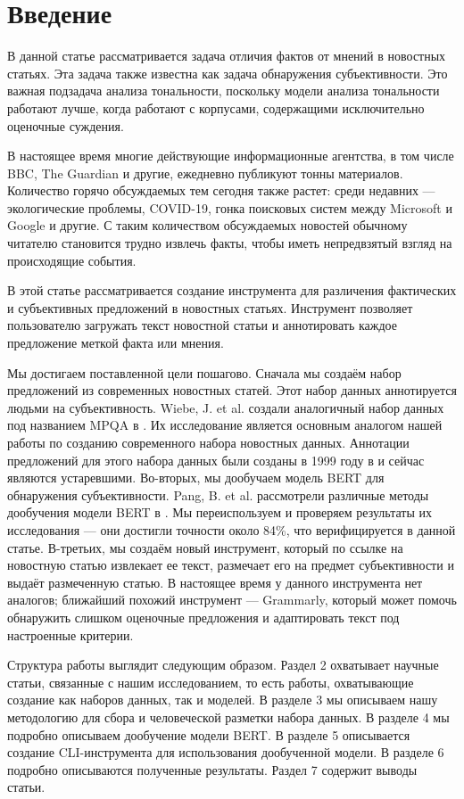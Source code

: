 \documentclass[a4paper,14pt]{extarticle}
\begin{document}
    \section{Введение}
    В данной статье рассматривается задача отличия фактов от мнений в новостных статьях. Эта задача также известна как задача обнаружения субъективности. Это важная подзадача анализа тональности, поскольку модели анализа тональности работают лучше, когда работают с корпусами, содержащими исключительно оценочные суждения.
    
    В настоящее время многие действующие информационные агентства, в том числе BBC, The Guardian и другие, ежедневно публикуют тонны материалов. Количество горячо обсуждаемых тем сегодня также растет: среди недавних — экологические проблемы, COVID-19, гонка поисковых систем между Microsoft и Google и другие. С таким количеством обсуждаемых новостей обычному читателю становится трудно извлечь факты, чтобы иметь непредвзятый взгляд на происходящие события.
    
    В этой статье рассматривается создание инструмента для различения фактических и субъективных предложений в новостных статьях. Инструмент позволяет пользователю загружать текст новостной статьи и аннотировать каждое предложение меткой факта или мнения.
    
    Мы достигаем поставленной цели пошагово. Сначала мы создаём набор предложений из современных новостных статей. Этот набор данных аннотируется людьми на субъективность. Wiebe, J. et al. создали аналогичный набор данных под названием MPQA в \cite{mpqa}. Их исследование является основным аналогом нашей работы по созданию современного набора новостных данных. Аннотации предложений для этого набора данных были созданы в 1999 году в \cite{mpqa-opinion} и сейчас являются устаревшими. Во-вторых, мы дообучаем модель BERT для обнаружения субъективности. Pang, B. et al. рассмотрели различные методы дообучения модели BERT в \cite{bert-finetune}. Мы переиспользуем и проверяем результаты их исследования --- они достигли точности около 84\%, что верифицируется в данной статье. В-третьих, мы создаём новый инструмент, который по ссылке на новостную статью извлекает ее текст, размечает его на предмет субъективности и выдаёт размеченную статью. В настоящее время у данного инструмента нет аналогов; ближайший похожий инструмент — Grammarly, который может помочь обнаружить слишком оценочные предложения и адаптировать текст под настроенные критерии.
    
    Структура работы выглядит следующим образом. Раздел 2 охватывает научные статьи, связанные с нашим исследованием, то есть работы, охватывающие создание как наборов данных, так и моделей. В разделе 3 мы описываем нашу методологию для сбора и человеческой разметки набора данных. В разделе 4 мы подробно описываем дообучение модели BERT. В разделе 5 описывается создание CLI-инструмента для использования дообученной модели. В разделе 6 подробно описываются полученные результаты. Раздел 7 содержит выводы статьи.
    
\end{document}
